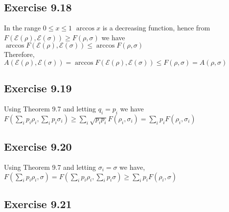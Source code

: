 \documentclass[a4paper,12pt]{article}
\begin{document}
\subsection*{Exercise 9.18}
In the range $0\leq x\leq 1$ $\arccos x$ is a decreasing function, hence from
$F(\mathcal{E}(\rho),\mathcal{E}(\sigma))\geq F(\rho, \sigma)$ we have\\
$\arccos{F(\mathcal{E}(\rho),\mathcal{E}(\sigma))}\leq \arccos{F(\rho, \sigma)}$\\
Therefore,\\
$A(\mathcal{E}(\rho),\mathcal{E}(\sigma))=\arccos{F(\mathcal{E}(\rho),\mathcal{E}(\sigma))}
\leq F(\rho, \sigma)=A(\rho, \sigma)$
\subsection*{Exercise 9.19}
Using Theorem 9.7 and letting $q_i=p_i$ we have\\
$F\left(\displaystyle \sum_i p_i\rho_i,\sum_ip_i\sigma_i\right)\geq \displaystyle \sum_i\sqrt{p_ip_i}F(\rho_i,\sigma_i)
=\sum_i p_iF(\rho_i, \sigma_i)$
\subsection*{Exercise 9.20}
Using Theorem 9.7 and letting $\sigma_i=\sigma$ we have,\\
$F\left(\displaystyle \sum_i p_i\rho_i,\sigma\right)=
F\left(\displaystyle \sum_i p_i\rho_i,\sum_ip_i\sigma\right)\geq
\displaystyle \sum_i p_iF(\rho_i, \sigma)$
\subsection*{Exercise 9.21}
\end{document}
